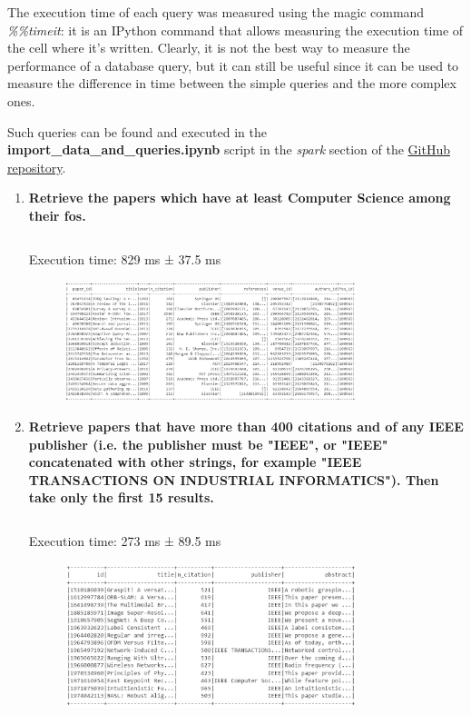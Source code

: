 \documentclass{Configuration_Files/PoliMi3i_thesis}
\begin{document}
The execution time of each query was measured using the magic command \textit{\%\%timeit}: it is an IPython command that allows measuring the execution time of the cell where it's written. Clearly, it is not the best way to measure the performance of a database query, but it can still be useful since it can be used to measure the difference in time between the simple queries and the more complex ones.

Such queries can be found and executed in the \textbf{import\_data\_and\_queries.ipynb} script in the \textit{spark} section of the \href{https://github.com/albertopirillo/smbud-project-2022}{GitHub repository}.

\begin{enumerate}

    \item \textbf{Retrieve the papers which have at least Computer Science among their fos.}
    \inputminted[linenos,tabsize=2,breaklines]{Python}{code/queries_spark/query_1.txt}
    Execution time: 829 ms ± 37.5 ms
    \begin{figure}[H]
        \centering
         \includegraphics[width=0.8\textwidth]{Images/queries_spark/query_1.jpg}
    \end{figure} 
    
    \item \textbf{Retrieve papers that have more than 400 citations and of any IEEE publisher (i.e. the publisher must be "IEEE", or "IEEE" concatenated with other strings, for example "IEEE TRANSACTIONS ON INDUSTRIAL INFORMATICS"). Then take only the first 15 results.}
    \inputminted[linenos,tabsize=2,breaklines]{Python}{code/queries_spark/query_2.txt}
    Execution time: 273 ms ± 89.5 ms
    \begin{figure}[H]
        \centering
         \includegraphics[width=0.8\textwidth]{Images/queries_spark/query_2.jpg}
    \end{figure} 


\end{enumerate}
\end{document}
